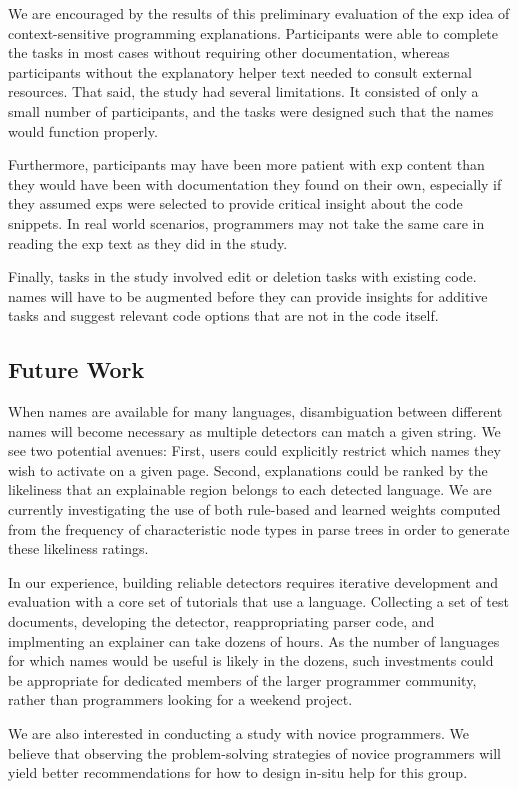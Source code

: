 We are encouraged by the results of this preliminary evaluation of the \gls{exp} idea of context-sensitive programming explanations.
Participants were able to complete the tasks in most cases without requiring other documentation, whereas participants without the explanatory helper text needed to consult external resources.
That said, the study had several limitations.  It consisted of only a small number of participants, and the tasks were designed such that the \Glspl{name} would function properly. 

Furthermore, participants may have been more patient with \gls{exp} content than they would have been with documentation they found on their own, especially if they assumed \glspl{exp} were selected to provide critical insight about the code snippets.
In real world scenarios, programmers may not take the same care in reading the \gls{exp} text as they did in the study.

Finally, tasks in the study involved edit or deletion tasks with existing code.
\Glspl{name} will have to be augmented before they can provide insights for additive tasks and suggest relevant code options that are not in the code itself.

\subsection{Future Work}

\begin{changes}
    When \Glspl{name} are available for many languages, disambiguation between different \Glspl{name} will become necessary as multiple detectors can match a given string.
We see two potential avenues: First, users could explicitly restrict which \Glspl{name} they wish to activate on a given page.
Second, explanations could be ranked by the likeliness that an explainable region belongs to each detected language.
We are currently investigating the use of both rule-based and learned weights computed from the frequency of characteristic node types in parse trees in order to generate these likeliness ratings.
\end{changes}

\begin{changes}
In our experience, building reliable detectors requires iterative development and evaluation with a core set of tutorials that use a language.
Collecting a set of test documents, developing the detector, reappropriating parser code, and implmenting an explainer can take dozens of hours.
As the number of languages for which \Glspl{name} would be useful is likely in the dozens, such investments could be appropriate for dedicated members of the larger programmer community, rather than programmers looking for a weekend project.
\end{changes}
\fi

We are also interested in conducting a study with novice programmers.
We believe that observing the problem-solving strategies of novice programmers will yield better recommendations for how to design in-situ help for this group.
